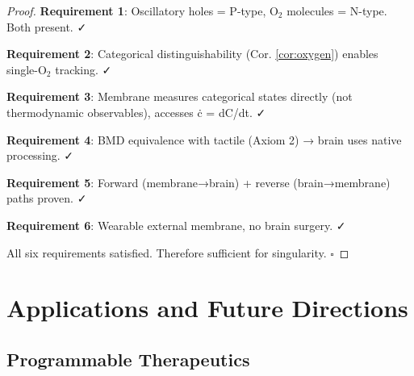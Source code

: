 \documentclass[11pt,a4paper]{article}
\theoremstyle{definition}
\theoremstyle{remark}
\begin{document}
\begin{proof}
\textbf{Requirement 1}: Oscillatory holes = P-type, O$_2$ molecules = N-type. Both present. ✓

\textbf{Requirement 2}: Categorical distinguishability (Cor. \ref{cor:oxygen}) enables single-O$_2$ tracking. ✓

\textbf{Requirement 3}: Membrane measures categorical states directly (not thermodynamic observables), accesses ċ = dC/dt. ✓

\textbf{Requirement 4}: BMD equivalence with tactile (Axiom 2) → brain uses native processing. ✓

\textbf{Requirement 5}: Forward (membrane→brain) + reverse (brain→membrane) paths proven. ✓

\textbf{Requirement 6}: Wearable external membrane, no brain surgery. ✓

All six requirements satisfied. Therefore sufficient for singularity. $\square$
\end{proof}

\section{Applications and Future Directions}

\subsection{Programmable Therapeutics}
\end{document}
